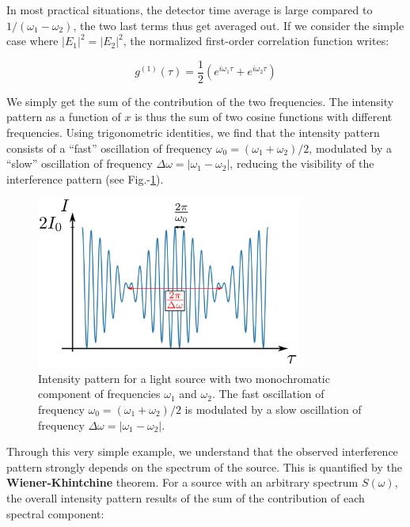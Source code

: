 \noindent In most practical situations, the detector time average is large compared to $1/(\omega_1 - \omega_2)$, the two last terms thus get averaged out. If we consider the simple case where $|E_1|^2=|E_2|^2$, the normalized first-order correlation function writes:

\begin{equation}
    g^{(1)} (\tau) = \frac{1}{2} (e^{i \omega_1 \tau} + e^{i \omega_2 \tau})
\end{equation}

\noindent We simply get the sum of the contribution of the two frequencies. The intensity pattern as a function of $x$ is thus the sum of two cosine functions with different frequencies. Using trigonometric identities, we find that the intensity pattern consists of a ``fast'' oscillation of frequency $\omega_0=(\omega_1 + \omega_2)/2$, modulated by a ``slow'' oscillation of frequency $\Delta \omega = |\omega_1 - \omega_2|$, reducing the visibility of the interference pattern (see Fig.-\ref{fig:michelson_two_lambda}).

\begin{figure}
    \centering
    \includegraphics[width=0.78\textwidth]{Fig/Chapter1/michelson_two_lambda.png}
    \caption{Intensity pattern for a light source with two monochromatic component of frequencies $\omega_1$ and $\omega_2$. The fast oscillation of frequency $\omega_0=(\omega_1+\omega_2)/2$ is modulated by a slow oscillation of frequency $\Delta \omega = |\omega_1 - \omega_2|$.}
    \label{fig:michelson_two_lambda}
\end{figure}

Through this very simple example, we understand that the observed interference pattern strongly depends on the spectrum of the source. This is quantified by the \textbf{Wiener-Khintchine} theorem. For a source with an arbitrary spectrum $S(\omega)$, the overall intensity pattern results of the sum of the contribution of each spectral component:

